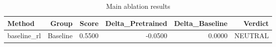 \begin{table}[htbp]
\centering
\caption{Main ablation results}
\label{tab:main-results}
\begin{tabular}{lrrrrr}
\toprule
\textbf{Method} & \textbf{Group} & \textbf{Score} & \textbf{Delta\_Pretrained} & \textbf{Delta\_Baseline} & \textbf{Verdict} \\
\midrule
baseline\_rl & Baseline & 0.5500 & -0.0500 & 0.0000 & NEUTRAL \\
\bottomrule
\end{tabular}
\end{table}